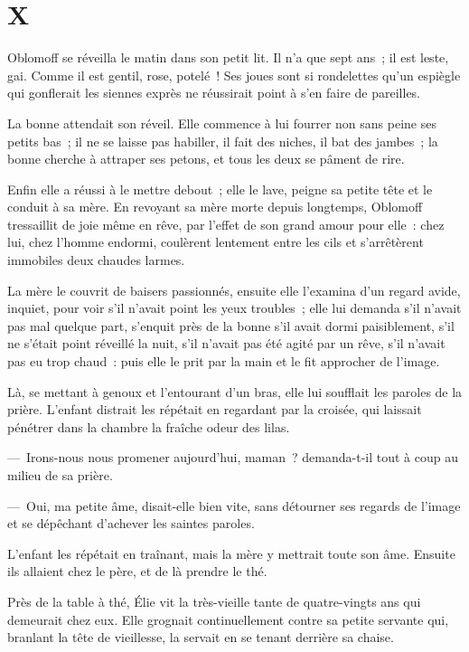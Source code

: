 \documentclass[french,twoside]{book} %
\begin{document}
\section[{X}]{X}\renewcommand{\leftmark}{X}

\noindent Oblomoff se réveilla le matin dans son petit lit. Il n’a que sept ans ; il est leste, gai. Comme il est gentil, rose, potelé ! Ses joues sont si rondelettes qu’un espiègle qui gonflerait les siennes exprès ne réussirait point à s’en faire de pareilles.\par
La bonne attendait son réveil. Elle commence à lui fourrer non sans peine ses petits bas ; il ne se laisse pas habiller, il fait des niches, il bat des jambes ; la bonne cherche à attraper ses petons, et tous les deux se pâment de rire.\par
Enfin elle a réussi à le mettre debout ; elle le lave, peigne sa petite tête et le conduit à sa mère. En revoyant sa mère morte depuis longtemps, Oblomoff tressaillit de joie même en rêve, par l’effet de son grand amour pour elle : chez lui, chez l’homme endormi, coulèrent lentement entre les cils et s’arrêtèrent immobiles deux chaudes larmes.\par
La mère le couvrit de baisers passionnés, ensuite elle l’examina d’un regard avide, inquiet, pour voir s’il n’avait point les yeux troubles ; elle lui demanda s’il n’avait pas mal quelque part, s’enquit près de la bonne s’il avait dormi paisiblement, s’il ne s’était point réveillé la nuit, s’il n’avait pas été agité par un rêve, s’il n’avait pas eu trop chaud : puis elle le prit par la main et le fit approcher de l’image.\par
Là, se mettant à genoux et l’entourant d’un bras, elle lui soufflait les paroles de la prière. L’enfant distrait les répétait en regardant par la croisée, qui laissait pénétrer dans la chambre la fraîche odeur des lilas.\par
— Irons-nous nous promener aujourd’hui, maman ? demanda-t-il tout à coup au milieu de sa prière.\par
— Oui, ma petite âme, disait-elle bien vite, sans détourner ses regards de l’image et se dépêchant d’achever les saintes paroles.\par
L’enfant les répétait en traînant, mais la mère y mettrait toute son âme. Ensuite ils allaient chez le père, et de là prendre le thé.\par
Près de la table à thé, Élie vit la très-vieille tante de quatre-vingts ans qui demeurait chez eux. Elle grognait continuellement contre sa petite servante qui, branlant la tête de vieillesse, la servait en se tenant derrière sa chaise.\par
\end{document}
